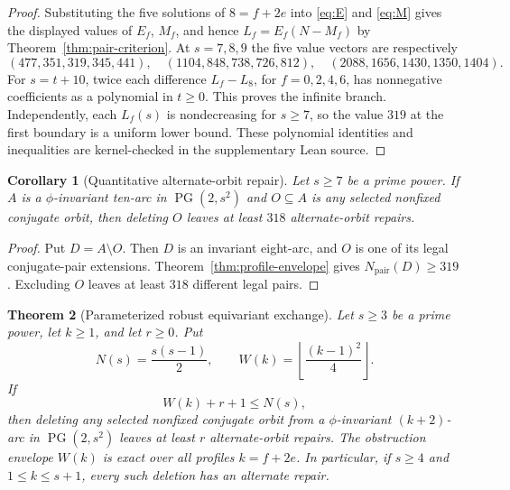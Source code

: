\documentclass[11pt]{article}
\newtheorem{theorem}{Theorem}[section]
\newtheorem{corollary}[theorem]{Corollary}
\theoremstyle{definition}
\theoremstyle{remark}
\newcommand{\PG}{\operatorname{PG}}
\newcommand{\Npair}{N_{\mathrm{pair}}}
\begin{document}
\begin{proof}
Substituting the five solutions of $8=f+2e$ into
\eqref{eq:E} and \eqref{eq:M} gives the displayed values of
$E_f$, $M_f$, and hence $L_f=E_f(N-M_f)$ by
Theorem~\ref{thm:pair-criterion}.  At $s=7,8,9$ the five value vectors are
respectively
\[
(477,351,319,345,441),\quad
(1104,848,738,726,812),\quad
(2088,1656,1430,1350,1404).
\]
For $s=t+10$, twice each difference $L_f-L_8$, for
$f=0,2,4,6$, has nonnegative coefficients as a polynomial in $t\ge0$.
This proves the infinite branch.  Independently, each $L_f(s)$ is
nondecreasing for $s\ge7$, so the value $319$ at the first boundary is a
uniform lower bound.  These polynomial identities and inequalities are
kernel-checked in the supplementary Lean source.
\end{proof}

\begin{corollary}[Quantitative alternate-orbit repair]
\label{cor:alternate-repair}
Let $s\ge7$ be a prime power.  If $A$ is a $\phi$-invariant ten-arc in
$\PG(2,s^2)$ and $O\subseteq A$ is any selected nonfixed conjugate orbit,
then deleting $O$ leaves at least $318$ alternate-orbit repairs.
\end{corollary}

\begin{proof}
Put $D=A\setminus O$.  Then $D$ is an invariant eight-arc, and $O$ is one
of its legal conjugate-pair extensions.  Theorem~\ref{thm:profile-envelope}
gives $\Npair(D)\ge319$.  Excluding $O$ leaves at least $318$ different
legal pairs.
\end{proof}

\begin{theorem}[Parameterized robust equivariant exchange]
\label{thm:parameterized-repair}
Let $s\ge3$ be a prime power, let $k\ge1$, and let $r\ge0$.  Put
\[
  N(s)=\frac{s(s-1)}2,
  \qquad
  W(k)=\left\lfloor\frac{(k-1)^2}{4}\right\rfloor.
\]
If
\begin{equation}\label{eq:repair-phase}
  W(k)+r+1\le N(s),
\end{equation}
then deleting any selected nonfixed conjugate orbit from a $\phi$-invariant
$(k+2)$-arc in $\PG(2,s^2)$ leaves at least $r$ alternate-orbit repairs.
The obstruction envelope $W(k)$ is exact over all profiles $k=f+2e$.
In particular, if $s\ge4$ and $1\le k\le s+1$, every such deletion has an
alternate repair.
\end{theorem}
\end{document}
